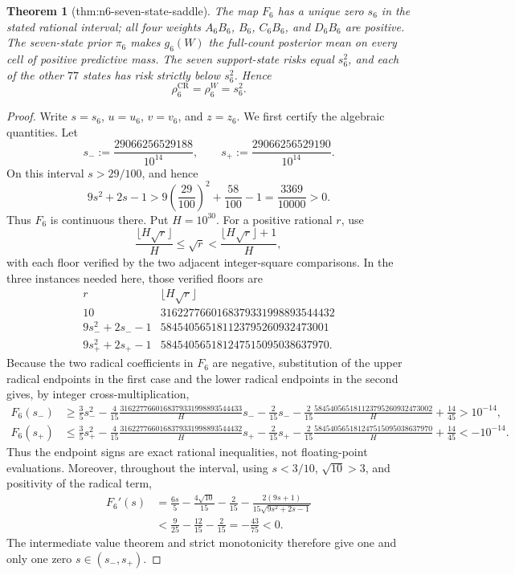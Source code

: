 \documentclass{article}
\newtheorem{theorem}{Theorem}
\begin{document}
\begin{theorem}[thm:n6-seven-state-saddle]\label{thm:n6-seven-state-saddle}
The map \(F_6\) has a unique zero \(s_6\) in the stated rational interval; all four weights \(A_6B_6\), \(B_6\), \(C_6B_6\), and \(D_6B_6\) are positive. The seven-state prior \(\pi_6\) makes \(g_6(W)\) the full-count posterior mean on every cell of positive predictive mass. The seven support-state risks equal \(s_6^2\), and each of the other \(77\) states has risk strictly below \(s_6^2\). Hence \[\rho_6^{\mathrm{CR}}=\rho_6^W=s_6^2.\]
\end{theorem}
\begin{proof}
Write \(s=s_6\), \(u=u_6\), \(v=v_6\), and \(z=z_6\).  We first certify the algebraic quantities.  Let
\[
 s_-:=\frac{29066256529188}{10^{14}},\qquad
 s_+:=\frac{29066256529190}{10^{14}}.
\]
On this interval \(s>29/100\), and hence
\[
 9s^2+2s-1>9\left(\frac{29}{100}\right)^2+\frac{58}{100}-1
 =\frac{3369}{10000}>0.
\]
Thus \(F_6\) is continuous there.  Put \(H=10^{30}\).  For a positive rational \(r\), use
\[
 \frac{\lfloor H\sqrt r\rfloor}{H}
 \leq\sqrt r<
 \frac{\lfloor H\sqrt r\rfloor+1}{H},
\]
with each floor verified by the two adjacent integer-square comparisons.  In the three instances needed here, those verified floors are
\[
\begin{array}{c|r}
r&\lfloor H\sqrt r\rfloor\\ \hline
10&3162277660168379331998893544432\\
9s_-^2+2s_--1&584540565181123795260932473001\\
9s_+^2+2s_+-1&584540565181247515095038637970.
\end{array}
\]
Because the two radical coefficients in \(F_6\) are negative, substitution of the upper radical endpoints in the first case and the lower radical endpoints in the second gives, by integer cross-multiplication,
\[
\begin{aligned}
F_6(s_-)&\geq \frac35s_-^2-\frac4{15}\frac{3162277660168379331998893544433}{H}s_-
-\frac2{15}s_--\frac2{15}\frac{584540565181123795260932473002}{H}+\frac{14}{45}
>10^{-14},\\
F_6(s_+)&\leq \frac35s_+^2-\frac4{15}\frac{3162277660168379331998893544432}{H}s_+
-\frac2{15}s_+-\frac2{15}\frac{584540565181247515095038637970}{H}+\frac{14}{45}
<-10^{-14}.
\end{aligned}
\]
Thus the endpoint signs are exact rational inequalities, not floating-point evaluations.  Moreover, throughout the interval, using \(s<3/10\), \(\sqrt{10}>3\), and positivity of the radical term,
\[
 \begin{aligned}
 F_6'(s)
 &=\frac{6s}{5}-\frac{4\sqrt{10}}{15}-\frac2{15}
   -\frac{2(9s+1)}{15\sqrt{9s^2+2s-1}}\\
 &<\frac9{25}-\frac{12}{15}-\frac2{15}
 =-\frac{43}{75}<0.
 \end{aligned}
\]
The intermediate value theorem and strict monotonicity therefore give one and only one zero \(s\in(s_-,s_+)\).


\end{proof}
\end{document}
